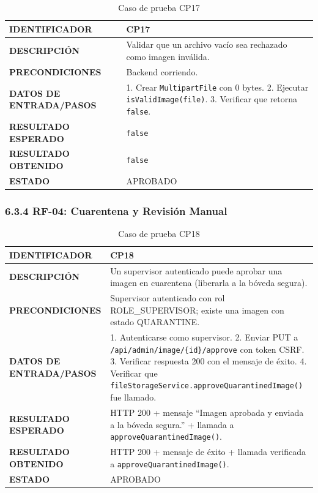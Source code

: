 \begin{table}[H]
\centering
\caption{Caso de prueba CP17}
\begin{tabular}{|p{3.5cm}|p{10.3cm}|}
\hline
\textbf{IDENTIFICADOR} & CP17 \\
\hline
\textbf{DESCRIPCIÓN} & Validar que un archivo vacío sea rechazado como imagen inválida. \\
\hline
\textbf{PRECONDICIONES} & Backend corriendo. \\
\hline
\textbf{DATOS DE ENTRADA/PASOS} & 1. Crear \texttt{MultipartFile} con 0 bytes. 2. Ejecutar \texttt{isValidImage(file)}. 3. Verificar que retorna \texttt{false}. \\
\hline
\textbf{RESULTADO ESPERADO} & \texttt{false} \\
\hline
\textbf{RESULTADO OBTENIDO} & \texttt{false} \\
\hline
\textbf{ESTADO} & APROBADO \\
\hline
\end{tabular}
\end{table}

\subsubsection{6.3.4 RF-04: Cuarentena y Revisión Manual}

\begin{table}[H]
\centering
\caption{Caso de prueba CP18}
\begin{tabular}{|p{3.5cm}|p{10.3cm}|}
\hline
\textbf{IDENTIFICADOR} & CP18 \\
\hline
\textbf{DESCRIPCIÓN} & Un supervisor autenticado puede aprobar una imagen en cuarentena (liberarla a la bóveda segura). \\
\hline
\textbf{PRECONDICIONES} & Supervisor autenticado con rol ROLE\_SUPERVISOR; existe una imagen con estado QUARANTINE. \\
\hline
\textbf{DATOS DE ENTRADA/PASOS} & 1. Autenticarse como supervisor. 2. Enviar PUT a \texttt{/api/admin/image/\{id\}/approve} con token CSRF. 3. Verificar respuesta 200 con el mensaje de éxito. 4. Verificar que \texttt{fileStorageService.approveQuarantinedImage()} fue llamado. \\
\hline
\textbf{RESULTADO ESPERADO} & HTTP 200 + mensaje ``Imagen aprobada y enviada a la bóveda segura.'' + llamada a \texttt{approveQuarantinedImage()}. \\
\hline
\textbf{RESULTADO OBTENIDO} & HTTP 200 + mensaje de éxito + llamada verificada a \texttt{approveQuarantinedImage()}. \\
\hline
\textbf{ESTADO} & APROBADO \\
\hline
\end{tabular}
\end{table}

